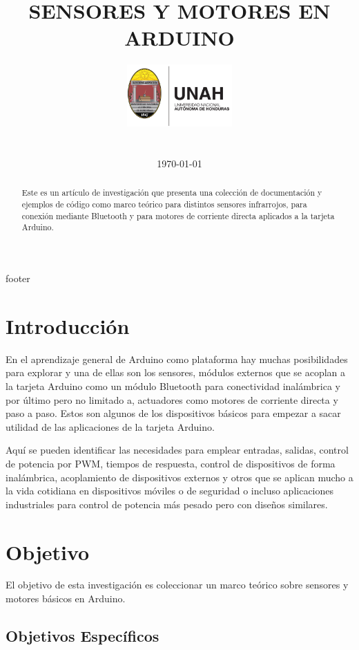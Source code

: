 \documentclass[conference]{IEEEtran}
\title{SENSORES Y MOTORES EN ARDUINO}
\author{
    \includegraphics[width = 40mm]{images/logo-unah}\\[8ex]
    \IEEEauthorblockN{Tobias Briones}
    \IEEEauthorblockN{tobias.briones@unah.hn}
    \IEEEauthorblockA{\textit{Universidad Nacional Autónoma de Honduras} \\
    \textit{Ingeniería de Sistemas} \\
    \textit{I PAC 2022} \\
    \textit{IS911-MICROPROCESADORES}} \\\vspace*{20pt} \normalsize  \\
    \today
}
\begin{document}
    \maketitle

    \begin{abstract}
        Este es un artículo de investigación que presenta una colección de documentación y ejemplos de código como marco teórico para distintos sensores infrarrojos, para conexión mediante Bluetooth y para motores de corriente directa aplicados a la tarjeta Arduino.
    \end{abstract}

    \tableofcontents

    {footer}

    \section{Introducción}

    En el aprendizaje general de Arduino como plataforma hay muchas posibilidades para explorar y una de ellas son los sensores, módulos externos que se acoplan a la tarjeta Arduino como un módulo Bluetooth para conectividad inalámbrica y por último pero no limitado a, actuadores como motores de corriente directa y paso a paso. Estos son algunos de los dispositivos básicos para empezar a sacar utilidad de las aplicaciones de la tarjeta Arduino.

    \bigbreak

    Aquí se pueden identificar las necesidades para emplear entradas, salidas, control de potencia por PWM, tiempos de respuesta, control de dispositivos de forma inalámbrica, acoplamiento de dispositivos externos y otros que se aplican mucho a la vida cotidiana en dispositivos móviles o de seguridad o incluso aplicaciones industriales para control de potencia más pesado pero con diseños similares.

    \section{Objetivo}

    El objetivo de esta investigación es coleccionar un marco teórico sobre sensores y motores básicos en Arduino.

    \subsection{Objetivos Específicos}
\end{document}
